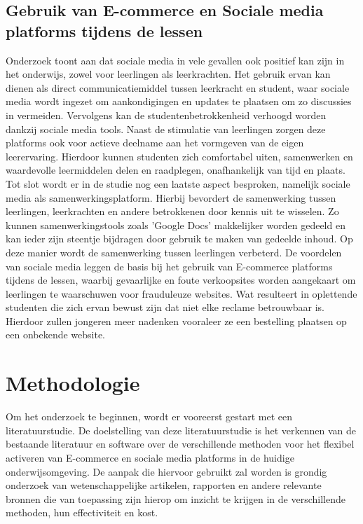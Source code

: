 \subsection{Gebruik van E-commerce en Sociale media platforms tijdens de lessen}
Onderzoek toont aan dat sociale media in vele gevallen ook positief kan zijn in het onderwijs, zowel voor leerlingen als leerkrachten. Het gebruik ervan kan dienen als direct communicatiemiddel tussen leerkracht en student, waar sociale media wordt ingezet om aankondigingen en updates te plaatsen om zo discussies in vermeiden. 
Vervolgens kan de studentenbetrokkenheid verhoogd worden dankzij sociale media tools. Naast de stimulatie van leerlingen zorgen deze platforms ook voor actieve deelname aan het vormgeven van de eigen leerervaring. Hierdoor kunnen studenten zich comfortabel uiten, samenwerken en waardevolle leermiddelen delen en raadplegen, onafhankelijk van tijd en plaats. \newline
Tot slot wordt er in de studie nog een laatste aspect besproken, namelijk sociale media als samenwerkingsplatform. Hierbij bevordert de samenwerking tussen leerlingen, leerkrachten en andere betrokkenen door kennis uit te wisselen. Zo kunnen samenwerkingstools zoals 'Google Docs' makkelijker worden gedeeld en kan ieder zijn steentje bijdragen door gebruik te maken van gedeelde inhoud. Op deze manier wordt de samenwerking tussen leerlingen verbeterd. \newline
De voordelen van sociale media leggen de basis bij het gebruik van E-commerce platforms tijdens de lessen, waarbij gevaarlijke en foute verkoopsites worden aangekaart om leerlingen te waarschuwen voor frauduleuze websites. Wat resulteert in oplettende studenten die zich ervan bewust zijn dat niet elke reclame betrouwbaar is. Hierdoor zullen jongeren meer nadenken vooraleer ze een bestelling plaatsen op een onbekende website.   \autocite{benefitsofsocialmedia} \autocite{onlinefraude}


\section{Methodologie}%
\label{sec:methodologie}
Om het onderzoek te beginnen, wordt er vooreerst gestart met een literatuurstudie. De doelstelling van deze literatuurstudie is het verkennen van de bestaande literatuur en software over de verschillende methoden voor het flexibel activeren van E-commerce en sociale media platforms in de huidige onderwijsomgeving. De aanpak die hiervoor gebruikt zal worden is grondig onderzoek van wetenschappelijke artikelen, rapporten en andere relevante bronnen die van toepassing zijn hierop om inzicht te krijgen in de verschillende methoden, hun effectiviteit en kost. \newline

